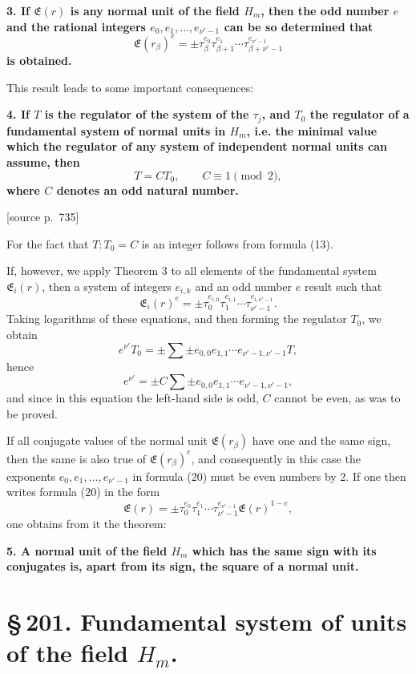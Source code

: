 \documentclass[11pt]{article}
\newcommand{\srcpage}[1]{\par\medskip\noindent\textsf{[source p.~#1]}\par\smallskip}
\begin{document}
\begin{center}\textbf{3. If $\mathfrak E(r)$ is any normal unit of the field $H_m$, then the odd number $e$ and the rational integers $e_0,e_1,\ldots,e_{\nu'-1}$ can be so determined that}
\[
\mathfrak E(r_\beta)^e=\pm\tau_\beta^{e_0}\tau_{\beta+1}^{e_1}\cdots\tau_{\beta+\nu'-1}^{e_{\nu'-1}}
\tag{20}
\]
\textbf{is obtained.}\end{center}

This result leads to some important consequences:

\begin{center}\textbf{4. If $T$ is the regulator of the system of the $\tau_j$, and $T_0$ the regulator of a fundamental system of normal units in $H_m$, i.e. the minimal value which the regulator of any system of independent normal units can assume, then}
\[
T=CT_0,
\qquad C\equiv1\pmod2,
\tag{21}
\]
\textbf{where $C$ denotes an odd natural number.}\end{center}

\srcpage{735}
For the fact that $T:T_0=C$ is an integer follows from formula (13).

If, however, we apply Theorem 3 to all elements of the fundamental system $\mathfrak E_i(r)$, then a system of integers $e_{i,k}$ and an odd number $e$ result such that
\[
\mathfrak E_i(r)^e=\pm\tau_0^{e_{i,0}}\tau_1^{e_{i,1}}\cdots\tau_{\nu'-1}^{e_{i,\nu'-1}}.
\]
Taking logarithms of these equations, and then forming the regulator $T_0$, we obtain
\[
e^{\nu'}T_0=\pm\sum\pm e_{0,0}e_{1,1}\cdots e_{\nu'-1,\nu'-1}T,
\]
hence
\[
e^{\nu'}=\pm C\sum\pm e_{0,0}e_{1,1}\cdots e_{\nu'-1,\nu'-1},
\]
and since in this equation the left-hand side is odd, $C$ cannot be even, as was to be proved.

If all conjugate values of the normal unit $\mathfrak E(r_\beta)$ have one and the same sign, then the same is also true of $\mathfrak E(r_\beta)^e$, and consequently in this case the exponents $e_0,e_1,\ldots,e_{\nu'-1}$ in formula (20) must be even numbers by 2. If one then writes formula (20) in the form
\[
\mathfrak E(r)=\pm\tau_0^{e_0}\tau_1^{e_1}\cdots\tau_{\nu'-1}^{e_{\nu'-1}}\mathfrak E(r)^{1-e},
\]
one obtains from it the theorem:

\begin{center}\textbf{5. A normal unit of the field $H_m$ which has the same sign with its conjugates is, apart from its sign, the square of a normal unit.}\end{center}

\section*{\S\,201. Fundamental system of units of the field $H_m$.}
\end{document}
